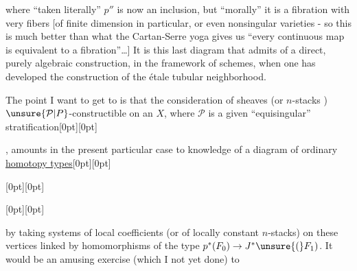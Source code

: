 %
where ``taken literally'' $p''$ is now an inclusion, but ``morally'' it is  a fibration with very  fibers [of finite dimension in particular, or even nonsingular varieties - so this is much better than what the Cartan-Serre yoga gives us ``every continuous map is equivalent to a fibration''\ldots] It is this last diagram that admits of a direct, purely algebraic construction, in the framework of schemes, when one has developed the construction of the étale tubular neighborhood.

The point I want to get to is that the consideration  of sheaves (or  $n$-stacks ) $\unsure{\mathcal P|P}$-constructible on an $X$, where $\mathcal P$ is a given ``equisingular'' stratification\raisebox{0pt}[0pt][0pt]{\parbox{0pt}{}}, amounts in the present particular case to knowledge of a diagram of ordinary \uline{homotopy types}\raisebox{0pt}[0pt][0pt]{\parbox{0pt}{}} \raisebox{0pt}[0pt][0pt]{\parbox{0pt}{}}
\raisebox{0pt}[0pt][0pt]{\parbox{0pt}{}}by taking systems of local coefficients (or of locally constant $n$-stacks) on these vertices  linked by  homomorphisms of the type $p^*(F_0)\to J^*\unsure{(}F_1)$. It would be an amusing exercise (which I  not yet done) to
